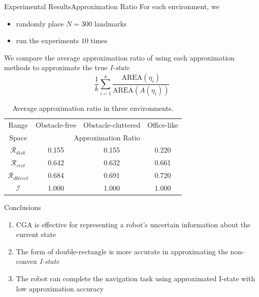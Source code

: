 \begin{frame}{Experimental Results}{Approximation Ratio}
  For each environment, we
  \begin{itemize}
  \item randomly place $N = 300$ landmarks 
  \item run the  experiments $10$ times
  \end{itemize} 
  \begin{block}{}
    We compare the average approximation ratio of using each approximation methods
    to approximate  the true \emph{I-state}
    $$\frac{1}{k} \sum_{i=1}^k \frac{\text{AREA}(\eta_i)}{\text{AREA}(A(\eta_i))}$$
  \end{block}
\begin{table}
  \footnotesize\centering
    \begin{tabular}{cccc} 
    \hline
    Range & Obstacle-free & Obstacle-cluttered & Office-like\\
    Space & \multicolumn{3}{c}{Approximation  Ratio}  \\
    \hline
      $\mathcal{R}_{disk}$ & 0.155  & 0.155   & 0.220 \\ 
    \hline
    $\mathcal{R}_{rect}$  & 0.642   & 0.632  & 0.661 \\
    \hline
    $\mathcal{R}_{dblrect}$ & 0.684 & 0.691  & 0.720 \\
    \hline
    $\mathcal{I}$ & 1.000  & 1.000  & 1.000 \\
    \hline
    \end{tabular}
    \caption{{Average approximation ratio in three environments.}}
\end{table}

\end{frame}

\begin{frame}{Conclusions}
  \begin{enumerate}
  \item CGA is effective for representing a robot's uncertain information about
    the current state
  \item The form of double-rectangle is more accurate in approximating the non-convex
    \emph{I-state}
  \item The robot can complete the navigation task using approximated I-state with
    low approximation accuracy
  \end{enumerate}
\end{frame}

